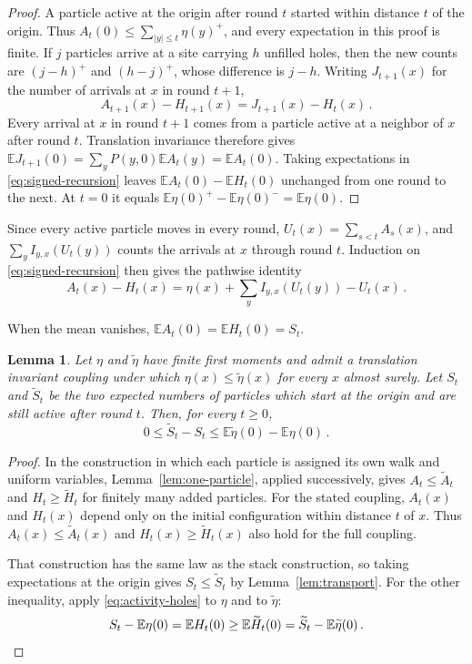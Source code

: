\documentclass[11pt]{amsart}
\theoremstyle{plain}
\newtheorem{lemma}[theorem]{Lemma}
\theoremstyle{definition}
\newcommand{\E}{\mathbb{E}}
\begin{document}
\begin{proof}
	A particle active at the origin after round $t$ started within distance $t$
	of the origin. Thus $A_t(0)\leq\sum_{|y|\leq t}\eta(y)^+$, and every
	expectation in this proof is finite. If $j$ particles arrive at a site
	carrying $h$ unfilled holes,
	then the new counts are $(j-h)^+$ and $(h-j)^+$, whose difference is $j-h$.
	Writing $J_{t+1}(x)$ for the number of arrivals at $x$ in round $t+1$,
	\begin{equation}\label{eq:signed-recursion}
		A_{t+1}(x)-H_{t+1}(x)=J_{t+1}(x)-H_t(x)\,.
	\end{equation}
	Every arrival at $x$ in round $t+1$ comes from a particle active at a neighbor
	of $x$ after round $t$. Translation invariance therefore gives
	$\E J_{t+1}(0)=\sum_yP(y,0)\E A_t(y)=\E A_t(0)$. Taking expectations in
	\eqref{eq:signed-recursion} leaves $\E A_t(0)-\E H_t(0)$ unchanged
	from one round to the next. At $t=0$ it equals
	$\E\eta(0)^+-\E\eta(0)^-=\E\eta(0)$.
\end{proof}

Since every active particle moves in every round, $U_t(x)=\sum_{s<t}A_s(x)$,
and $\sum_yI_{y,x}(U_t(y))$ counts the arrivals at $x$ through round $t$.
Induction on \eqref{eq:signed-recursion} then gives the pathwise identity
\begin{equation}\label{eq:signed-count}
	A_t(x)-H_t(x)=\eta(x)+\sum_yI_{y,x}(U_t(y))-U_t(x)\,.
\end{equation}

When the mean vanishes, $\E A_t(0)=\E H_t(0)=S_t$.

\begin{lemma}\label{lem:density-compare}
	Let $\eta$ and $\widetilde\eta$ have finite first moments and admit a
	translation invariant coupling under which
	$\eta(x)\leq\widetilde\eta(x)$ for every $x$ almost surely. Let $S_t$ and
	$\widetilde S_t$ be the two expected numbers of particles which start at
	the origin and are still active after round $t$. Then, for every $t\geq0$,
	\[
		0\leq\widetilde S_t-S_t
		\leq\E\widetilde\eta(0)-\E\eta(0)\,.
	\]
\end{lemma}

\begin{proof}
	In the construction in which each particle is assigned its own walk and
	uniform variables, Lemma~\ref{lem:one-particle}, applied successively, gives
	$A_t\leq\widetilde A_t$ and $H_t\geq\widetilde H_t$ for finitely many added
	particles. For the stated coupling, $A_t(x)$ and $H_t(x)$ depend only on the
	initial configuration within distance $t$ of $x$. Thus
	$A_t(x)\leq\widetilde A_t(x)$ and
	$H_t(x)\geq\widetilde H_t(x)$ also hold for the full coupling.

	That construction has the same law as the stack construction, so taking
	expectations at the origin gives $S_t\leq\widetilde S_t$ by
	Lemma~\ref{lem:transport}. For the other inequality, apply
	\eqref{eq:activity-holes} to $\eta$ and to $\widetilde\eta$:
	\[
		S_t-\E\eta(0)=\E H_t(0)\geq\E\widetilde H_t(0)
		=\widetilde S_t-\E\widetilde\eta(0)\,. \qedhere
	\]
\end{proof}
\end{document}
